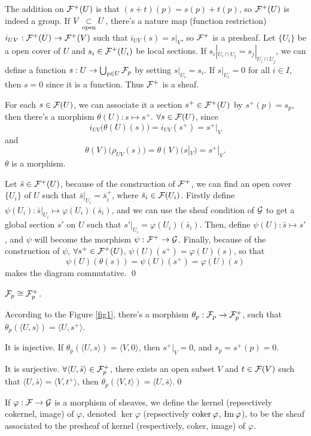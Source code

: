 \documentclass[10pt]{extbook}
\begin{document}
	The addition on $\mathcal{F}^+(U)$ is that $(s+t)(p)=s(p)+t(p)$, so $\mathcal{F}^+(U)$ is indeed a 
	group. If $V\underset{\mathrm{open}}{\subset} U$, there's a nature map (function restriction) 
	$i_{UV}:\mathcal{F}^+(U)\to \mathcal{F}^+(V)$ such that $i_{UV}(s)=s|_V$, so $\mathcal{F}^+$ is a presheaf. 
	Let $\{U_i\}$ be a open cover of $U$ and $s_i\in \mathcal{F}^+(U_i)$ be local sections. 
	If $s_i|_{U_i\cap U_j}=s_j|_{U_i\cap U_j}$, we can define a function 
	$s:U\to \bigcup_{p\in U}\mathcal{F}_p$ by setting $s|_{U_i}=s_i$. If $s|_{U_i}=0$ for all 
	$i\in I$, then $s=0$ since it is a function. Thus $\mathcal{F}^+$ is a sheaf.

	For each $s\in \mathcal{F}(U)$, we can associate it a section $s^+\in \mathcal{F}^+(U)$ by 
	$s^+(p)=s_p$, then there's a morphism 
	$\theta(U):s\mapsto s^+$. $\forall s\in \mathcal{F}(U)$, since
	\[
		i_{UV}\bigl(\theta(U)(s)\bigr)=i_{UV}(s^+)=s^+|_{V}
	\]
	and
	\[
		\theta(V)\bigl(\rho_{UV}(s)\bigr)=\theta(V)(s|_V)=s^+|_{V}.
	\]
	$\theta$ is a morphism.

	Let $\bar{s}\in \mathcal{F}^+(U)$, because of the construction of $\mathcal{F}^+$, we can find an 
	open cover $\{U_i\}$ of $U$ such that $\bar{s}|_{U_i}=\bar{s}^+_i$, where
	$\bar{s}_i\in \mathcal{F}(U_i)$. Firstly define 
	$\psi(U_i):\bar{s}|_{U_i}\mapsto \varphi(U_i)(\bar{s}_i)$, and we can use the sheaf 
	condition of $\mathcal{G}$ to get a global section $s'$ on $U$ such that 
	$s'|_{U_i}=\varphi(U_i)(\bar{s}_i)$. Then, define $\psi(U):\bar{s}\mapsto s'$, and 
	$\psi$ will become the morphism $\psi:\mathcal{F}^+\to \mathcal{G}$. Finally, because of the 
	construction of $\psi$, $\forall s^+\in \mathcal{F}^+(U)$, $\psi(U)(s^+)=\varphi(U)(s)$, so 
	that
	\[
		\psi(U)(\theta(s))=\psi(U)(s^+)=\varphi(U)(s)
	\]
	makes the diagram commutative. \qed

\pro \label{pro:4} $\mathcal{F}_p\cong \mathcal{F}^+_p$.

\proof According to the Figure \ref{fig1}, there's a morphism 
$\theta_p:\mathcal{F}_p\to \mathcal{F}^+_p$, such that 
$\theta_p(\langle U,s\rangle)=\langle U,s^+\rangle$.

It is injective. If $\theta_p(\langle U,s\rangle)=\langle V,0\rangle$, then $s^+|_V=0$,
and $s_p=s^+(p)=0$.

It is surjective. $\forall \langle U,\bar{s}\rangle\in \mathcal{F}^+_p$, there exists an open 
subset $V$ and $t\in \mathcal{F}(V)$ such that $\langle U,\bar{s}\rangle=\langle V,t^+\rangle$, 
then $\theta_p(\langle V,t\rangle)=\langle U,\bar{s}\rangle$.\qed

\para If $\varphi:\mathcal{F}\to\mathcal{G}$ is a morphism of sheaves, we define the kernel 
(repsectively cokernel, image) of $\varphi$, denoted $\ker \varphi$ (repsectively 
$\operatorname{coker} \varphi$, $\operatorname{Im} \varphi$), to be the sheaf associated to the presheaf of kernel 
(respectively, coker, image) of $\varphi$.
\end{document}
